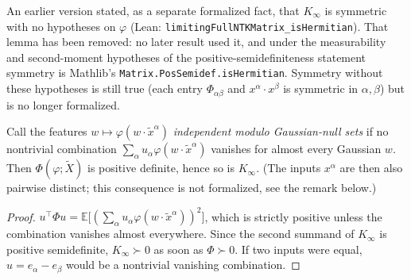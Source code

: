 \begin{remark}\label{rmk:ntktl:limitingPropsChange}
An earlier version stated, as a separate formalized fact, that $K_\infty$ is symmetric with no hypotheses on $\varphi$ (Lean: \texttt{limitingFullNTKMatrix\_isHermitian}). That lemma has been removed: no later result used it, and under the measurability and second-moment hypotheses of the positive-semidefiniteness statement symmetry is Mathlib's \texttt{Matrix.PosSemidef.isHermitian}. Symmetry without these hypotheses is still true (each entry $\Phi_{\alpha\beta}$ and $x^\alpha\cdot x^\beta$ is symmetric in $\alpha,\beta$) but is no longer formalized.
\end{remark}


\begin{theorem}\label{thm:ntktl:posDef}
  \leanok
Call the features $w\mapsto\varphi(w\cdot\tilde x^\alpha)$ \emph{independent modulo Gaussian-null sets} if no nontrivial combination $\sum_\alpha u_\alpha\varphi(w\cdot\tilde x^\alpha)$ vanishes for almost every Gaussian $w$.
Then $\Phi(\varphi;\tilde X)$ is positive definite, hence so is $K_\infty$. (The inputs $x^\alpha$ are then also pairwise distinct; this consequence is not formalized, see the remark below.)
\end{theorem}

\begin{proof}
  \leanok
$u^\top\Phi u=\mathbb E\bigl[(\sum_\alpha u_\alpha\varphi(w\cdot\tilde x^\alpha))^2\bigr]$, which is strictly positive unless the combination vanishes almost everywhere. Since the second summand of $K_\infty$ is positive semidefinite, $K_\infty\succ0$ as soon as
$\Phi\succ0$. If two inputs were equal, $u=e_\alpha-e_\beta$ would be a nontrivial vanishing combination.
\end{proof}

